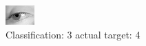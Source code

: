 \begin{figure}[h!]
\begin{center}
\includegraphics[width=0.60\columnwidth]{figures/ID2907_class_3_target_4.png}
\end{center}
\caption{ Classification: 3 actual target: 4}
\label{fig:ID2907_class_3_target_4}
\end{figure}
